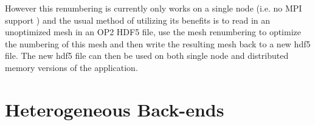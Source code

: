 \documentclass[11pt]{article}
\begin{document}
However this renumbering is currently only works on a single node (i.e. no MPI support ) and the usual method of
utilizing its benefits is to read in an unoptimized mesh in an OP2 HDF5 file, use the mesh renumbering to optimize the
numbering of this mesh and then write the resulting mesh back to a new hdf5 file. The new hdf5 file can then be used on
both single node and distributed memory versions of the application.





\newpage
\section{Heterogeneous Back-ends}\label{sec/heterogeneous}
\end{document}
